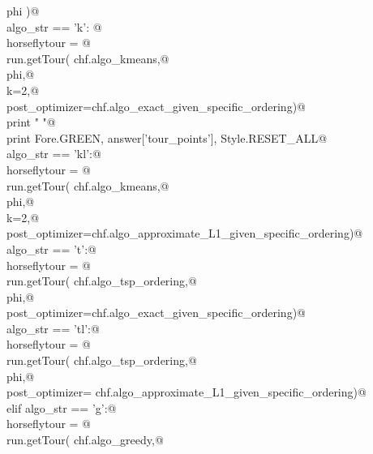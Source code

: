 \documentclass[12pt]{report}
\begin{document}
\begin{flushleft}
\begin{list}{}{}
\mbox{}\verb@                          phi )@\\
\mbox{}\verb@elif algo_str == 'k': @\\
\mbox{}\verb@      horseflytour = @\\
\mbox{}\verb@             run.getTour( chf.algo_kmeans,@\\
\mbox{}\verb@                          phi,@\\
\mbox{}\verb@                          k=2,@\\
\mbox{}\verb@                          post_optimizer=chf.algo_exact_given_specific_ordering)@\\
\mbox{}\verb@      print " "@\\
\mbox{}\verb@      print Fore.GREEN, answer['tour_points'], Style.RESET_ALL@\\
\mbox{}\verb@elif algo_str == 'kl':@\\
\mbox{}\verb@      horseflytour = @\\
\mbox{}\verb@             run.getTour( chf.algo_kmeans,@\\
\mbox{}\verb@                          phi,@\\
\mbox{}\verb@                          k=2,@\\
\mbox{}\verb@                          post_optimizer=chf.algo_approximate_L1_given_specific_ordering)@\\
\mbox{}\verb@elif algo_str == 't':@\\
\mbox{}\verb@      horseflytour = @\\
\mbox{}\verb@             run.getTour( chf.algo_tsp_ordering,@\\
\mbox{}\verb@                          phi,@\\
\mbox{}\verb@                          post_optimizer=chf.algo_exact_given_specific_ordering)@\\
\mbox{}\verb@elif algo_str == 'tl':@\\
\mbox{}\verb@      horseflytour = @\\
\mbox{}\verb@             run.getTour( chf.algo_tsp_ordering,@\\
\mbox{}\verb@                          phi,@\\
\mbox{}\verb@                          post_optimizer= chf.algo_approximate_L1_given_specific_ordering)@\\
\mbox{}\verb@ elif algo_str == 'g':@\\
\mbox{}\verb@      horseflytour = @\\
\mbox{}\verb@             run.getTour( chf.algo_greedy,@\\

\end{list}
\end{flushleft}
\end{document}
